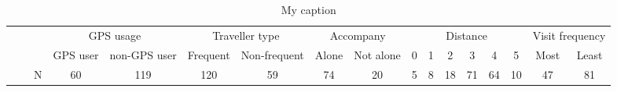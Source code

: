 \documentclass{sigchi}
\begin{document}
\begin{table}[t]
	\centering
	\caption{My caption}
	\begin{adjustbox}{width=1\textwidth}
		\small
		\label{my-label}
		\begin{tabular}{ccccccccccccccccc}
			\cline{4-17}
			\multicolumn{1}{c}{}                                 & \multicolumn{1}{c}{}                         & \multicolumn{1}{c|}{}      & \multicolumn{2}{c|}{GPS usage}                                                                                       & \multicolumn{2}{c|}{Traveller type}                                                                                  & \multicolumn{2}{c|}{Accompany}                                                                                               & \multicolumn{6}{c|}{Distance}                                                                                                                                                                                                                                                                                                            & \multicolumn{2}{c|}{Visit frequency}                                                                                 \\ \cline{4-17} 
			\multicolumn{1}{c}{}                                 & \multicolumn{1}{c}{}                         & \multicolumn{1}{c|}{}      & \multicolumn{1}{c|}{GPS user}                             & \multicolumn{1}{c|}{non-GPS user}                        & \multicolumn{1}{c|}{Frequent}                             & \multicolumn{1}{c|}{Non-frequent}                        & \multicolumn{1}{c|}{Alone}                                     & \multicolumn{1}{c|}{Not alone}                              & \multicolumn{1}{c|}{0}                                & \multicolumn{1}{c|}{1}                               & \multicolumn{1}{c|}{2}                               & \multicolumn{1}{c|}{3}                               & \multicolumn{1}{c|}{4}                               & \multicolumn{1}{c|}{5}                               & \multicolumn{1}{c|}{Most}                                 & \multicolumn{1}{c|}{Least}                               \\ \hline
			\multicolumn{1}{|c|}{}                               & \multicolumn{1}{c|}{}                        & \multicolumn{1}{c|}{N}     & \multicolumn{1}{c|}{\cellcolor[HTML]{ACDDAA}60}           & \multicolumn{1}{c|}{\cellcolor[HTML]{ACDDAA}119}         & \multicolumn{1}{c|}{120}                                  & \multicolumn{1}{c|}{59}                                  & \multicolumn{1}{c|}{\cellcolor[HTML]{ACDDAA}74}                & \multicolumn{1}{c|}{\cellcolor[HTML]{ACDDAA}20}             & \multicolumn{1}{c|}{\cellcolor[HTML]{ACDDAA}5}        & \multicolumn{1}{c|}{\cellcolor[HTML]{ACDDAA}8}       & \multicolumn{1}{c|}{\cellcolor[HTML]{ACDDAA}18}      & \multicolumn{1}{c|}{\cellcolor[HTML]{ACDDAA}71}      & \multicolumn{1}{c|}{\cellcolor[HTML]{ACDDAA}64}      & \multicolumn{1}{c|}{\cellcolor[HTML]{ACDDAA}10}      & \multicolumn{1}{c|}{\cellcolor[HTML]{ACDDAA}47}           & \multicolumn{1}{c|}{\cellcolor[HTML]{ACDDAA}81}          \\ \cline{3-17} 

\end{tabular}
\end{adjustbox}
\end{table}
\end{document}

